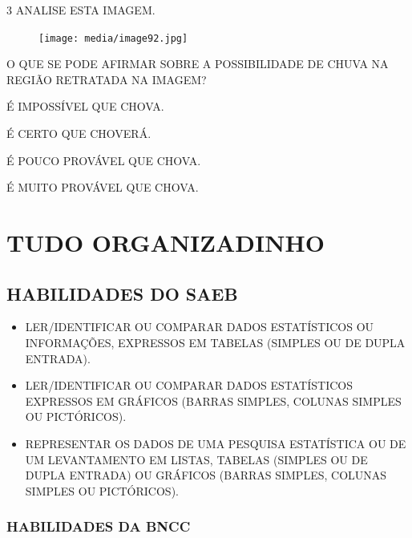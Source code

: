 \num{3} ANALISE ESTA IMAGEM.

\begin{figure}[H]
\centering
\texttt{[image: media/image92.jpg]}
\end{figure}

O QUE SE PODE AFIRMAR SOBRE A POSSIBILIDADE DE CHUVA NA REGIÃO RETRATADA NA IMAGEM?

\begin{escolha}
\item É IMPOSSÍVEL QUE CHOVA.

\item É CERTO QUE CHOVERÁ.

\item É POUCO PROVÁVEL QUE CHOVA.

\item É MUITO PROVÁVEL QUE CHOVA.
\end{escolha}


\chapter{TUDO ORGANIZADINHO}


\section*{HABILIDADES DO SAEB}

\begin{itemize}
\item \uppercase{Ler/identificar ou comparar dados estatísticos ou informações,
expressos em tabelas (simples ou de dupla entrada).}

\item \uppercase{Ler/identificar ou comparar dados estatísticos expressos em gráficos
(barras simples, colunas simples ou pictóricos).}

\item \uppercase{Representar os dados de uma pesquisa estatística ou de um levantamento
em listas, tabelas (simples ou de dupla entrada) ou gráficos (barras
simples, colunas simples ou pictóricos).}
\end{itemize}

\subsection{HABILIDADES DA BNCC}

